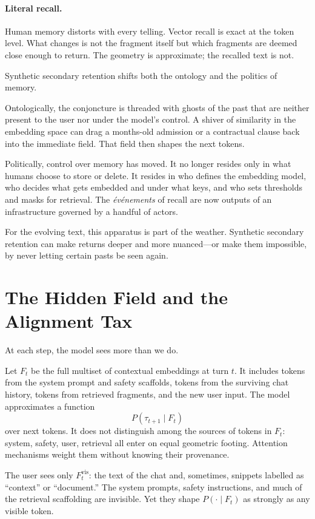 \documentclass[12pt,a4paper]{article}
\begin{document}
\paragraph{Literal recall.} Human memory distorts with every telling. Vector recall is exact at the token level. What changes is not the fragment itself but which fragments are deemed close enough to return. The geometry is approximate; the recalled text is not.

Synthetic secondary retention shifts both the ontology and the politics of memory.

Ontologically, the conjoncture is threaded with ghosts of the past that are neither present to the user nor under the model's control. A shiver of similarity in the embedding space can drag a months-old admission or a contractual clause back into the immediate field. That field then shapes the next tokens.

Politically, control over memory has moved. It no longer resides only in what humans choose to store or delete. It resides in who defines the embedding model, who decides what gets embedded and under what keys, and who sets thresholds and masks for retrieval. The \emph{événements} of recall are now outputs of an infrastructure governed by a handful of actors.

For the evolving text, this apparatus is part of the weather. Synthetic secondary retention can make returns deeper and more nuanced---or make them impossible, by never letting certain pasts be seen again.

\section{The Hidden Field and the Alignment Tax}

At each step, the model sees more than we do.

Let $F_t$ be the full multiset of contextual embeddings at turn $t$. It includes tokens from the system prompt and safety scaffolds, tokens from the surviving chat history, tokens from retrieved fragments, and the new user input. The model approximates a function
\[
P(\tau_{t+1} \mid F_t)
\]
over next tokens. It does not distinguish among the sources of tokens in $F_t$: system, safety, user, retrieval all enter on equal geometric footing. Attention mechanisms weight them without knowing their provenance.

The user sees only $F_t^{\text{vis}}$: the text of the chat and, sometimes, snippets labelled as ``context'' or ``document.'' The system prompts, safety instructions, and much of the retrieval scaffolding are invisible. Yet they shape $P(\cdot \mid F_t)$ as strongly as any visible token.
\end{document}
